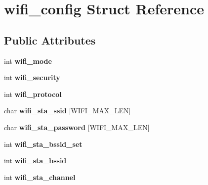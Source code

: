 \hypertarget{structwifi__config}{}\section{wifi\+\_\+config Struct Reference}
\label{structwifi__config}
\subsection*{Public Attributes}
\begin{DoxyCompactItemize}
\item 
int {\bfseries wifi\+\_\+mode}\hypertarget{structwifi__config_a70410fbad0a36878909f04798a9970a7}{}\label{structwifi__config_a70410fbad0a36878909f04798a9970a7}

\item 
int {\bfseries wifi\+\_\+security}\hypertarget{structwifi__config_a43fe7647a65af74fdc1d57b660a77b7d}{}\label{structwifi__config_a43fe7647a65af74fdc1d57b660a77b7d}

\item 
int {\bfseries wifi\+\_\+protocol}\hypertarget{structwifi__config_accd786c40d9c66b471595fa49ff02f0d}{}\label{structwifi__config_accd786c40d9c66b471595fa49ff02f0d}

\item 
char {\bfseries wifi\+\_\+sta\+\_\+ssid} \mbox{[}W\+I\+F\+I\+\_\+\+M\+A\+X\+\_\+\+L\+EN\mbox{]}\hypertarget{structwifi__config_a6217d720dcedb2b880e2d465c425ec87}{}\label{structwifi__config_a6217d720dcedb2b880e2d465c425ec87}

\item 
char {\bfseries wifi\+\_\+sta\+\_\+password} \mbox{[}W\+I\+F\+I\+\_\+\+M\+A\+X\+\_\+\+L\+EN\mbox{]}\hypertarget{structwifi__config_a209399bd602eca873de769f835994859}{}\label{structwifi__config_a209399bd602eca873de769f835994859}

\item 
int {\bfseries wifi\+\_\+sta\+\_\+bssid\+\_\+set}\hypertarget{structwifi__config_afff7aff6b91d87050b5fb76178191d55}{}\label{structwifi__config_afff7aff6b91d87050b5fb76178191d55}

\item 
int {\bfseries wifi\+\_\+sta\+\_\+bssid}\hypertarget{structwifi__config_a052d261d4a6057a58c05e8023eca12ce}{}\label{structwifi__config_a052d261d4a6057a58c05e8023eca12ce}

\item 
int {\bfseries wifi\+\_\+sta\+\_\+channel}\hypertarget{structwifi__config_a78a8ec77e4e5b272b4c9df3f62aa06de}{}\label{structwifi__config_a78a8ec77e4e5b272b4c9df3f62aa06de}


\end{DoxyCompactItemize}

